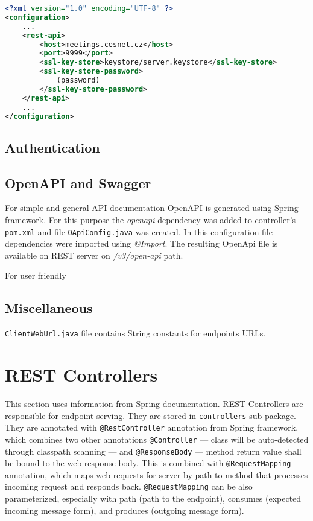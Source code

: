\begin{lstlisting}[language=XML, caption=REST configuration example, label=conf]
<?xml version="1.0" encoding="UTF-8" ?>
<configuration>
    ...
    <rest-api>
        <host>meetings.cesnet.cz</host>
        <port>9999</port>
        <ssl-key-store>keystore/server.keystore</ssl-key-store>
        <ssl-key-store-password>
            (password)
        </ssl-key-store-password>
    </rest-api>
    ...
</configuration>
\end{lstlisting}

\subsection{Authentication}
\subsection{OpenAPI and Swagger}
For simple and general API documentation \hyperref[sec:openapi]{OpenAPI} is generated using \hyperref[sec:spring]{Spring framework}.
For this purpose the \emph{openapi} dependency was added to controller's \texttt{pom.xml} and file \texttt{OApiConfig.java} was created. In this configuration file dependencies were imported using \emph{@Import}.
The resulting OpenApi file is available on REST server on \emph{/v3/open-api} path.

For user friendly 

\subsection{Miscellaneous}
\texttt{ClientWebUrl.java} file contains String constants for endpoints URLs.

\section{REST Controllers}
This section uses information from Spring documentation. \cite{springdoc}
REST Controllers are responsible for endpoint serving.
They are stored in \texttt{controllers} sub-package.
They are annotated with \texttt{@RestController} annotation from Spring framework, which combines two other annotations \texttt{@Controller} --- class will be auto-detected through classpath scanning --- and \texttt{@ResponseBody} --- method return value shall be bound to the web response body.
This is combined with \texttt{@RequestMapping} annotation, which maps web requests for server by path to method that processes incoming request and responds back. \texttt{@RequestMapping} can be also parameterized, especially with path (path to the endpoint), consumes (expected incoming message form), and produces (outgoing message form).

